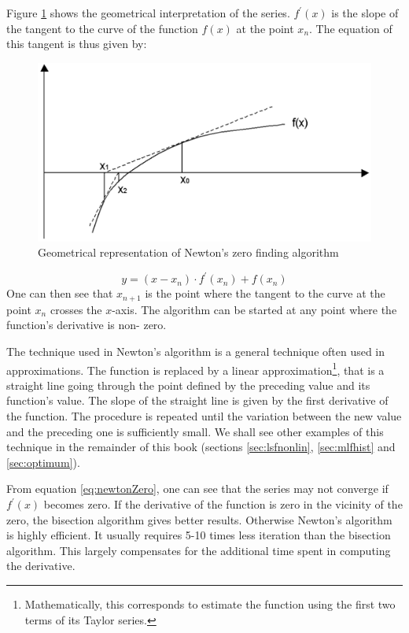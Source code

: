 \documentclass[twoside]{book}
\begin{document}
Figure \ref{fig:newtonZero} shows the geometrical interpretation
of the series. $f^{\prime}\left(x\right)$ is the slope of the
tangent to the curve of the function $f\left(x\right)$ at the
point $x_n$. The equation of this tangent is thus given by:
\begin{figure}
\centering\includegraphics[width=12cm]{Figures/NewtonGraph}
\caption{Geometrical representation of Newton's zero finding
algorithm}\label{fig:newtonZero}
\end{figure}
\begin{equation}
  y=\left(x-x_n\right)\cdot f^{\prime}\left(x_n\right)+f\left(x_n\right)
\end{equation}
One can then see that $x_{n+1}$ is the point where the tangent to
the curve at the point $x_n$ crosses the $x$-axis. The algorithm
can be started at any point where the function's derivative is
non- zero.

The technique used in Newton's algorithm is a general technique
often used in approximations. The function is replaced by a linear
approximation\footnote{Mathematically, this corresponds to
estimate the function using the first two terms of its Taylor
series.}, that is a straight line going through the point defined
by the preceding value and its function's value. The slope of the
straight line is given by the first derivative of the function.
The procedure is repeated until the variation between the new
value and the preceding one is sufficiently small. We shall see
other examples of this technique in the remainder of this book
(\cf sections \ref{sec:lsfnonlin}, \ref{sec:mlfhist} and
\ref{sec:optimum}).

From equation \ref{eq:newtonZero}, one can see that the series may
not converge if $f^{\prime}\left(x\right)$ becomes zero. If the
derivative of the function is zero in the vicinity of the zero,
the bisection algorithm gives better results. Otherwise Newton's
algorithm is highly efficient. It usually requires 5-10 times less
iteration than the bisection algorithm. This largely compensates
for the additional time spent in computing the derivative.
\end{document}
